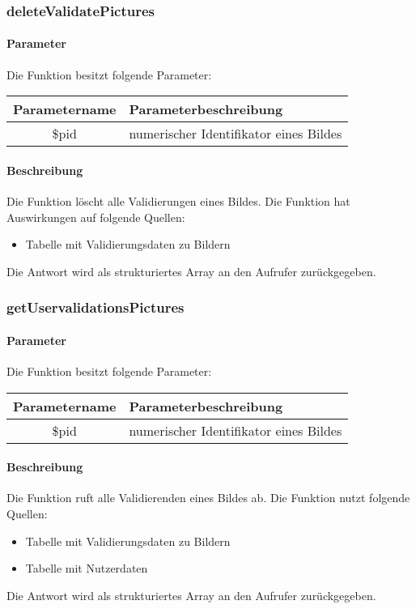 \subsubsection{deleteValidatePictures}
\paragraph{Parameter} Die Funktion besitzt folgende Parameter:
\begin{table}[H]
	\begin{tabular}{|c|p{11cm}|}
		\hline
		\textbf{Parametername} & \textbf{Parameterbeschreibung} \\ \hline
		\$pid & numerischer Identifikator eines Bildes \\ \hline
	\end{tabular}
\end{table}
\paragraph{Beschreibung} Die Funktion löscht alle Validierungen eines Bildes. Die Funktion hat Auswirkungen auf folgende Quellen: 
\begin{itemize}
	\item Tabelle mit Validierungsdaten zu Bildern
\end{itemize}
Die Antwort wird als strukturiertes Array an den Aufrufer zurückgegeben.
\subsubsection{getUservalidationsPictures}
\paragraph{Parameter} Die Funktion besitzt folgende Parameter:
\begin{table}[H]
	\begin{tabular}{|c|p{11cm}|}
		\hline
		\textbf{Parametername} & \textbf{Parameterbeschreibung} \\ \hline
		\$pid & numerischer Identifikator eines Bildes \\ \hline
	\end{tabular}
\end{table}
\paragraph{Beschreibung} Die Funktion ruft alle Validierenden eines Bildes ab. Die Funktion nutzt folgende Quellen:
\begin{itemize}
	\item Tabelle mit Validierungsdaten zu Bildern
	\item Tabelle mit Nutzerdaten
\end{itemize}
Die Antwort wird als strukturiertes Array an den Aufrufer zurückgegeben.
